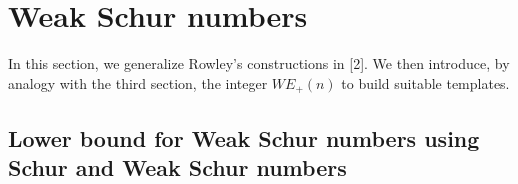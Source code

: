 \documentclass{article}
\newtheorem{computational theorem}{Computational Theorem}[section]
\begin{document}
\subsection{}


\section{Weak Schur numbers}

In this section, we generalize Rowley's constructions in [2]. We then introduce, by analogy with the third section, the integer \(WE_+(n)\) 
to build suitable templates.

\subsection{Lower bound for Weak Schur numbers using Schur and Weak Schur numbers}
\end{document}

